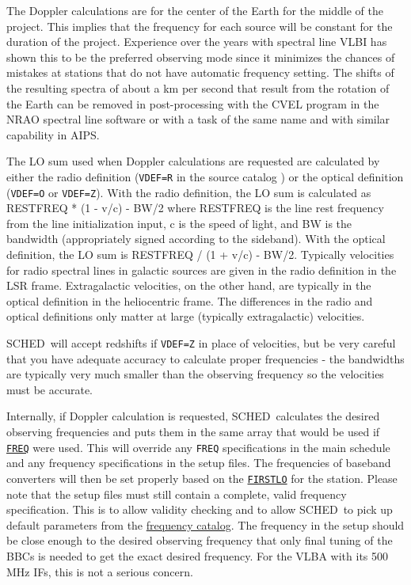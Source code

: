 \documentclass{report}
\newcommand{\schedb}{{\sc SCHED~}}
\begin{document}
The Doppler calculations are for the center of the Earth for the
middle of the project. This implies that the frequency for each source
will be constant for the duration of the project. Experience over the
years with spectral line VLBI has shown this to be the preferred
observing mode since it minimizes the chances of mistakes at stations
that do not have automatic frequency setting. The shifts of the
resulting spectra of about a km per second that result from the
rotation of the Earth can be removed in post-processing with the {\sc
CVEL} program in the NRAO spectral line software or with a task of the
same name and with similar capability in {\sc AIPS}.

The LO sum used when Doppler calculations are requested are calculated
by either the radio definition ({\tt VDEF=R} in the source catalog )
or the optical definition ({\tt VDEF=O} or {\tt VDEF=Z}). With the
radio definition, the LO sum is calculated as RESTFREQ * (1 - v/c) -
BW/2 where RESTFREQ is the line rest frequency from the line
initialization input, c is the speed of light, and BW is the bandwidth
(appropriately signed according to the sideband).  With the optical
definition, the LO sum is RESTFREQ / (1 + v/c) - BW/2.  Typically
velocities for radio spectral lines in galactic sources are given in
the radio definition in the LSR frame.  Extragalactic velocities, on
the other hand, are typically in the optical definition in the
heliocentric frame.  The differences in the radio and optical
definitions only matter at large (typically extragalactic) velocities.

\schedb will accept redshifts if {\tt VDEF=Z} in place of
velocities, but be very careful that you have adequate accuracy
to calculate proper frequencies - the bandwidths are typically
very much smaller than the observing frequency so the velocities
must be accurate.

Internally, if Doppler calculation is requested, \schedb calculates
the desired observing frequencies and puts them in the same array that
would be used if 
{\hyperref[MP:FREQ]{{\tt FREQ}}} were used. This will
override any {\tt FREQ} specifications in the main schedule and any
frequency specifications in the setup files.  The frequencies of
baseband converters will then be set properly based on the
{\hyperref[SP:FIRSTLO]{{\tt FIRSTLO}}} for the station.  Please note that
the setup files must still contain a complete, valid frequency
specification.  This is to allow validity checking and to allow
\schedb to pick up default parameters from the
{\hyperref[SEC:FRQCAT]{frequency catalog}}.  The frequency in the setup
should be close enough to the desired observing frequency that only
final tuning of the BBCs is needed to get the exact desired frequency.
For the VLBA with its 500 MHz IFs, this is not a serious concern. 
\end{document}
